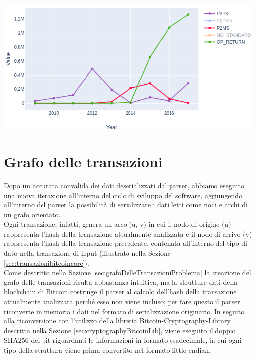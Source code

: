 {\centering
\vspace{15pt}
\includegraphics[scale=0.5]{images/OP_RETUTN_chart.png}
\vspace{10pt}
\par}


\section{Grafo delle transazioni} \label{sec:solGraphTX}

Dopo un accurata convalida dei dati deserializzati dal parser, abbiamo eseguito una nuova iterazione all'interno del ciclo di sviluppo del software, aggiungendo all'interno del parser la possibilità di serializzare i dati letti come nodi e archi di un grafo orientato.\\
Ogni transazione, infatti, genera un arco (u, v) in cui il nodo di origine (u) rappresenta l'hash della transazione attualmente analizzata e il nodo di arrivo (v) rappresenta l'hash della transazione precedente, contenuta all'interno del tipo di dato  nella transazione di input (illustrato nella Sezione \ref{sec:transazionibitcoincore}).\\
Come descritto nella Sezione \ref{sec:grafoDelleTransazioniProblema} la creazione del grafo delle transazioni risulta abbastanza intuitiva, ma la strutture dati della blockchain di Bitcoin costringe il parser al calcolo dell'hash della transazione attualmente analizzata perché esso non viene incluso; per fare questo il parser riconverte in memoria i dati nel formato di serializzazione originario.
In seguito alla riconversione con l'utilizzo della libreria Bitcoin-Cryptography-Library descritta nella Sezione \ref{sec:cryptographyBitcoinLib}, viene eseguito il doppio SHA256 dei bit riguardanti le informazioni in formato esadecimale, in cui ogni tipo della struttura viene prima convertito nel formato little-endian.\\


